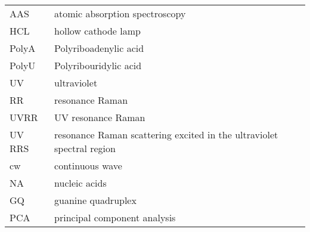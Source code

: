 

\noindent
\begin{tabularx}{\textwidth}{@{}l@{\,\dotfill\dots\,}X@{}}
AAS
	& atomic absorption spectroscopy\\
HCL
	& hollow cathode lamp\\
PolyA
	& Polyriboadenylic acid\\
PolyU
	& Polyribouridylic acid\\
UV
	& ultraviolet\\
RR
	& resonance Raman\\
UVRR
	& UV resonance Raman\\
UV RRS
	& resonance Raman scattering excited in the ultraviolet spectral region\\
cw
	& continuous wave\\
NA
	& nucleic acids\\
GQ
	& guanine quadruplex\\
PCA
	& principal component analysis
\end{tabularx}
